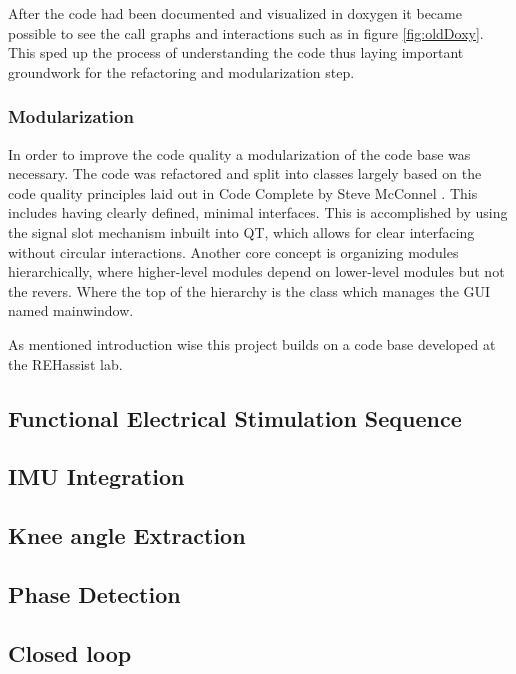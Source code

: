 After the code had been documented and visualized in doxygen it became possible to see the call graphs and interactions such as in figure \ref{fig:oldDoxy}. This sped up the process of understanding the code thus laying important groundwork for the refactoring and modularization step.

\subsubsection{Modularization}
In order to improve the code quality a modularization of the code base was necessary. The code was refactored and split into classes largely based on the code quality principles laid out in Code Complete by Steve McConnel \cite{steve_mcconnell_code_nodate}. This includes having clearly defined, minimal interfaces. This is accomplished by using the signal slot mechanism inbuilt into QT, which allows for clear interfacing without circular interactions. Another core concept is organizing modules hierarchically, where higher-level modules depend on lower-level modules but not the revers. Where the top of the hierarchy is the class which manages the GUI named mainwindow.







As mentioned introduction wise this project builds on a code base developed at the REHassist lab. 

\subsection{Functional Electrical Stimulation Sequence}

\subsection{IMU Integration}

\subsection{Knee angle Extraction}

\subsection{Phase Detection}

\subsection{Closed loop}

